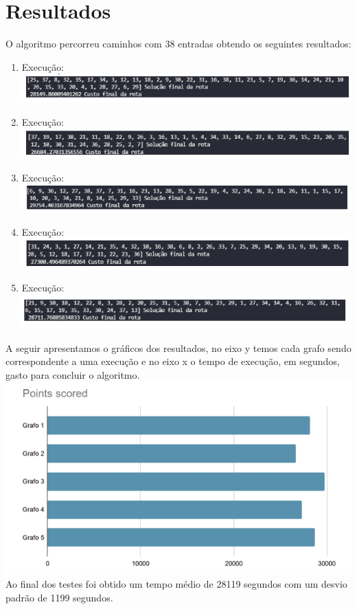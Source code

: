 \documentclass[12pt,openright,oneside,a4paper,brazil]{abntex2}
\begin{document}
\section{Resultados}
O algoritmo percorreu caminhos com 38 entradas obtendo os seguintes resultados: 
      \begin{enumerate}
      	\item Execução:	\\
			\includegraphics[scale=0.8]{caixeiro-execução1.png}
      	\item Execução:\\
			\includegraphics[scale=0.8]{caixeiro-execução2.png}		
      	\item Execução:\\
			\includegraphics[scale=0.8]{caixeiro-execução3.png}		
      	\item Execução:\\
			\includegraphics[scale=0.8]{caixeiro-execução4.png}
      	\item Execução:\\
			\includegraphics[scale=0.8]{caixeiro-execução6.png}		    	
      \end{enumerate}
A seguir apresentamos o gráficos dos resultados, no eixo y temos cada grafo sendo correspondente a uma execução e no eixo x o tempo de execução, em segundos, gasto para concluir o algoritmo.\\
		      	\includegraphics[scale=0.8]{execução.png}		\\
Ao final dos testes foi obtido um tempo médio de 28119 segundos com um desvio padrão de 1199 segundos. 
\end{document}
